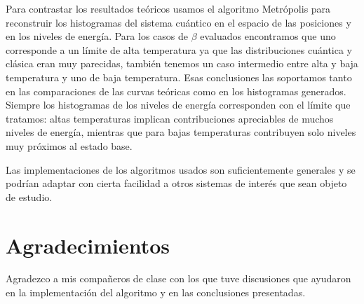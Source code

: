 \documentclass[%
 reprint,
 amsmath,amssymb,
 aps,
 pra,
]{revtex4-2}
\begin{document}
Para contrastar los resultados teóricos usamos el algoritmo Metrópolis para reconstruir los histogramas del sistema cuántico en el espacio de las posiciones y en los niveles de energía. Para los casos de $\beta$ evaluados encontramos que uno corresponde a un límite de alta temperatura ya que las distribuciones cuántica y clásica eran muy parecidas, también tenemos un caso intermedio entre alta y baja temperatura y uno de baja temperatura. Esas conclusiones las soportamos tanto en las comparaciones de las curvas teóricas como en los histogramas generados. Siempre los histogramas de los niveles de energía corresponden con el límite que tratamos: altas temperaturas implican contribuciones apreciables de muchos niveles de energía, mientras que para bajas temperaturas contribuyen solo niveles muy próximos al estado base.

Las implementaciones de los algoritmos usados son suficientemente generales y se podrían adaptar con cierta facilidad a otros sistemas de interés que sean objeto de estudio.

\section*{Agradecimientos}
Agradezco a mis compañeros de clase con los que tuve discusiones que ayudaron en la implementación del algoritmo y en las conclusiones presentadas.

\nocite{*}


\newpage



\appendix
\end{document}
